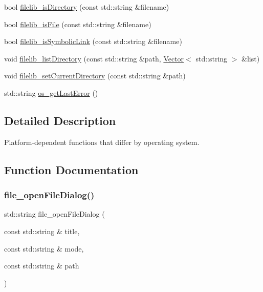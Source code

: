\begin{DoxyCompactItemize}
bool \mbox{\hyperlink{namespaceplatform_a68319ac7586223f385d7785f1b38e1b9}{filelib\+\_\+is\+Directory}} (const std\+::string \&filename)
\item 
bool \mbox{\hyperlink{namespaceplatform_aca0d9e2b4896bfd0f7a5cd64049188fc}{filelib\+\_\+is\+File}} (const std\+::string \&filename)
\item 
bool \mbox{\hyperlink{namespaceplatform_a69dc63b6fb991650c05dde15b04ca465}{filelib\+\_\+is\+Symbolic\+Link}} (const std\+::string \&filename)
\item 
void \mbox{\hyperlink{namespaceplatform_a8562b0c0644e6c38bef3fc07457bc93e}{filelib\+\_\+list\+Directory}} (const std\+::string \&path, \mbox{\hyperlink{classVector}{Vector}}$<$ std\+::string $>$ \&list)
\item 
void \mbox{\hyperlink{namespaceplatform_afe79a966d14e3b8d08939712884fa9d3}{filelib\+\_\+set\+Current\+Directory}} (const std\+::string \&path)
\item 
std\+::string \mbox{\hyperlink{namespaceplatform_a33caced893c9dd544cd80f354c5ec359}{os\+\_\+get\+Last\+Error}} ()
\end{DoxyCompactItemize}


\subsection{Detailed Description}
Platform-\/dependent functions that differ by operating system. 

\subsection{Function Documentation}
\mbox{\label{namespaceplatform_aa812fb80e0cb15f75d35975ea91e8f2b}} 
\subsubsection{\texorpdfstring{file\+\_\+open\+File\+Dialog()}{file\_openFileDialog()}}
{\footnotesize\ttfamily std\+::string file\+\_\+open\+File\+Dialog (\begin{DoxyParamCaption}\item[{const std\+::string \&}]{title,  }\item[{const std\+::string \&}]{mode,  }\item[{const std\+::string \&}]{path }\end{DoxyParamCaption})}


